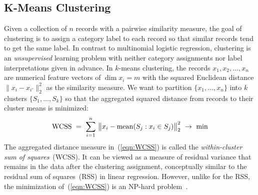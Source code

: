 \begin{comment}

 Licensed to the Apache Software Foundation (ASF) under one
 or more contributor license agreements.  See the NOTICE file
 distributed with this work for additional information
 regarding copyright ownership.  The ASF licenses this file
 to you under the Apache License, Version 2.0 (the
 "License"); you may not use this file except in compliance
 with the License.  You may obtain a copy of the License at

   http://www.apache.org/licenses/LICENSE-2.0

 Unless required by applicable law or agreed to in writing,
 software distributed under the License is distributed on an
 "AS IS" BASIS, WITHOUT WARRANTIES OR CONDITIONS OF ANY
 KIND, either express or implied.  See the License for the
 specific language governing permissions and limitations
 under the License.

\end{comment}

\subsection{K-Means Clustering}

\smallskip

Given a collection of $n$ records with a pairwise similarity measure,
the goal of clustering is to assign a category label to each record so that
similar records tend to get the same label.  In contrast to multinomial
logistic regression, clustering is an \emph{unsupervised}\/ learning problem
with neither category assignments nor label interpretations given in advance.
In $k$-means clustering, the records $x_1, x_2, \ldots, x_n$ are numerical
feature vectors of $\dim x_i = m$ with the squared Euclidean distance 
$\|x_i - x_{i'}\|_2^2$ as the similarity measure.  We want to partition
$\{x_1, \ldots, x_n\}$ into $k$ clusters $\{S_1, \ldots, S_k\}$ so that
the aggregated squared distance from records to their cluster means is
minimized:
\begin{equation}
\textrm{WCSS}\,\,=\,\, \sum_{i=1}^n \,\big\|x_i - \mathop{\mathrm{mean}}\nolimits(S_j: x_i\in S_j)\big\|_2^2 \,\,\to\,\,\min
\label{eqn:WCSS}
\end{equation}
The aggregated distance measure in~(\ref{eqn:WCSS}) is called the
\emph{within-cluster sum of squares}~(WCSS).  It can be viewed as a measure
of residual variance that remains in the data after the clustering assignment,
conceptually similar to the residual sum of squares~(RSS) in linear regression.
However, unlike for the RSS, the minimization of~(\ref{eqn:WCSS}) is an NP-hard 
problem~\cite{AloiseDHP2009:kmeans}.

